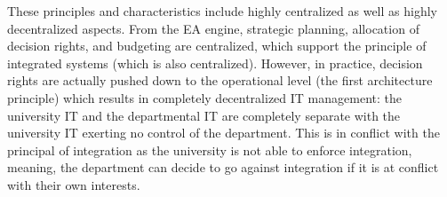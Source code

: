These principles and characteristics include highly centralized as well as highly decentralized aspects. From the EA engine, strategic planning, allocation of decision rights, and budgeting are centralized, which support the principle of integrated systems (which is also centralized). However, in practice, decision rights are actually pushed down to the operational level (the first architecture principle) which results in completely decentralized IT management: the university IT and the departmental IT are completely separate with the university IT exerting no control of the department. This is in conflict with the principal of integration as the university is not able to enforce integration, meaning, the department can decide to go against integration if it is at conflict with their own interests. 
